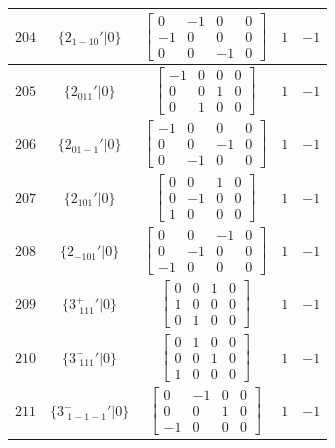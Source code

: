 \documentclass[fleqn,8pt]{jsarticle}
\begin{document}
\begin{longtable}{ccccc}
$ 204 $ & $ \{2{}_{1-10}{}'|0\} $ & $ \begin{bmatrix} 0 & -1 & 0 & 0 \\ -1 & 0 & 0 & 0 \\ 0 & 0 & -1 & 0 \end{bmatrix} $ & $ 1 $ & $ -1 $ \\ \hline
$ 205 $ & $ \{2{}_{011}{}'|0\} $ & $ \begin{bmatrix} -1 & 0 & 0 & 0 \\ 0 & 0 & 1 & 0 \\ 0 & 1 & 0 & 0 \end{bmatrix} $ & $ 1 $ & $ -1 $ \\ \hline
$ 206 $ & $ \{2{}_{01-1}{}'|0\} $ & $ \begin{bmatrix} -1 & 0 & 0 & 0 \\ 0 & 0 & -1 & 0 \\ 0 & -1 & 0 & 0 \end{bmatrix} $ & $ 1 $ & $ -1 $ \\ \hline
$ 207 $ & $ \{2{}_{101}{}'|0\} $ & $ \begin{bmatrix} 0 & 0 & 1 & 0 \\ 0 & -1 & 0 & 0 \\ 1 & 0 & 0 & 0 \end{bmatrix} $ & $ 1 $ & $ -1 $ \\ \hline
$ 208 $ & $ \{2{}_{-101}{}'|0\} $ & $ \begin{bmatrix} 0 & 0 & -1 & 0 \\ 0 & -1 & 0 & 0 \\ -1 & 0 & 0 & 0 \end{bmatrix} $ & $ 1 $ & $ -1 $ \\ \hline
$ 209 $ & $ \{3^{+}_{\,\,111}{}'|0\} $ & $ \begin{bmatrix} 0 & 0 & 1 & 0 \\ 1 & 0 & 0 & 0 \\ 0 & 1 & 0 & 0 \end{bmatrix} $ & $ 1 $ & $ -1 $ \\ \hline
$ 210 $ & $ \{3^{-}_{\,\,111}{}'|0\} $ & $ \begin{bmatrix} 0 & 1 & 0 & 0 \\ 0 & 0 & 1 & 0 \\ 1 & 0 & 0 & 0 \end{bmatrix} $ & $ 1 $ & $ -1 $ \\ \hline
$ 211 $ & $ \{3^{-}_{\,\,1-1-1}{}'|0\} $ & $ \begin{bmatrix} 0 & -1 & 0 & 0 \\ 0 & 0 & 1 & 0 \\ -1 & 0 & 0 & 0 \end{bmatrix} $ & $ 1 $ & $ -1 $ \\ \hline

\end{longtable}
\end{document}
